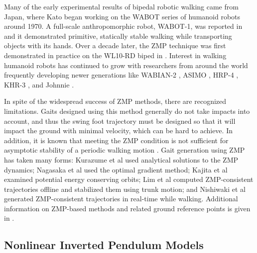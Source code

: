 Many of the early experimental results of bipedal robotic walking came from
Japan, where Kato began working on the WABOT series of humanoid robots around
1970.
%
A full-scale anthropomorphic robot, WABOT-1, was reported in \cite{Kato1974} and
it demonstrated primitive, statically stable walking while transporting objects
with its hands.
%
Over a decade later, the ZMP technique was first demonstrated in practice on the
WL10-RD biped in \cite{Takanishi1985}.
%
Interest in walking humanoid robots has continued to grow with researchers from
around the world frequently developing newer generations like WABIAN-2
\cite{Ogura2006}, ASIMO \cite{Sakagami2002}, HRP-4 \cite{Kaneko2011}, KHR-3
\cite{Park2005}, and Johnnie \cite{Pfeiffer2002}.
%


In spite of the widespread success of ZMP methods, there are recognized
limitations.
%
Gaits designed using this method generally do not take impacts into account, and
thus the swing foot trajectory must be designed so that it will impact the
ground with minimal velocity, which can be hard to achieve.
%
In addition, it is known that meeting the ZMP condition is not sufficient for
asymptotic stability of a periodic walking motion \cite{Choi2005}.
%
Gait generation using ZMP has taken many forms:
%
Kurazume et al \cite{Kurazume2003} used analytical solutions to the ZMP
dynamics;
%
Nagasaka et al \cite{Nagasaka1999} used the optimal gradient method;
%
Kajita et al \cite{Kajita1992} examined potential energy conserving orbits;
%
Lim et al \cite{Lim2002} computed ZMP-consistent trajectories offline and
stabilized them using trunk motion;
%
and Nishiwaki et al \cite{Nishiwaki2002} generated ZMP-consistent trajectories in real-time
while walking.
%
Additional information on ZMP-based methods and related ground reference points
is given in \cite{Goswami1999,Vukobratovic2004,Vukobratovic2006,Popovic2005}.

%

\subsection{Nonlinear Inverted Pendulum Models}

